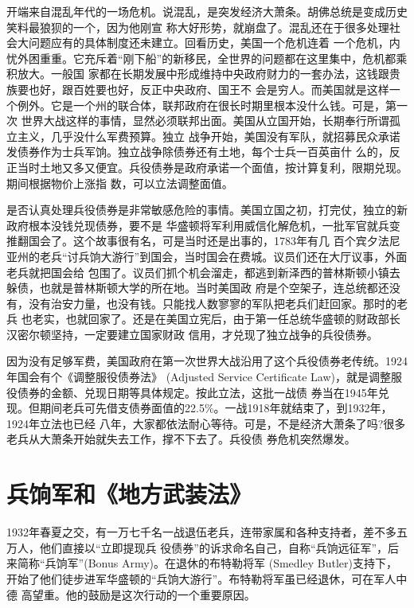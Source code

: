 \documentclass[10pt]{article}
\begin{document}
{开端来自混乱年代的一场危机。说混乱，是突发经济大萧条。胡佛总统是变成历史笑料最狼狈的一个，因为他刚宣
称大好形势，就崩盘了。混乱还在于很多处理社会大问题应有的具体制度还未建立。回看历史，美国一个危机连着
一个危机，内忧外困重重。它充斥着``刚下船''的新移民，全世界的问题都在这里集中，危机都乘积放大。一般国
家都在长期发展中形成维持中央政府财力的一套办法，这钱跟贵族要也好，跟百姓要也好，反正中央政府、国王不
会是穷人。而美国就是这样一个例外。它是一个州的联合体，联邦政府在很长时期里根本没什么钱。可是，第一次
世界大战这样的事情，显然必须联邦出面。美国从立国开始，长期奉行所谓孤立主义，几乎没什么军费预算。独立
战争开始，美国没有军队，就招募民众承诺发债券作为士兵军饷。独立战争除债券还有土地，每个士兵一百英亩什
么的，反正当时土地又多又便宜。兵役债券是政府承诺一个面值，按计算复利，限期兑现。期间根据物价上涨指
数，可以立法调整面值。

是否认真处理兵役债券是非常敏感危险的事情。美国立国之初，打完仗，独立的新政府根本没钱兑现债券，要不是
华盛顿将军利用威信化解危机，一批军官就兵变推翻国会了。这个故事很有名，可是当时还是出事的，1783年有几
百个宾夕法尼亚州的老兵``讨兵饷大游行''到国会，当时国会在费城。议员们还在大厅议事，外面老兵就把国会给
包围了。议员们抓个机会溜走，都逃到新泽西的普林斯顿小镇去躲债，也就是普林斯顿大学的所在地。当时美国政
府是个空架子，连总统都还没有，没有治安力量，也没有钱。只能找人数寥寥的军队把老兵们赶回家。那时的老兵
也老实，也就回家了。还是在美国立宪后，由于第一任总统华盛顿的财政部长汉密尔顿坚持，一定要建立国家财政
信用，才兑现了独立战争的兵役债券。

因为没有足够军费，美国政府在第一次世界大战沿用了这个兵役债券老传统。1924年国会有个《调整服役债券法》
(Adjusted Service Certificate Law)，就是调整服役债券的金额、兑现日期等具体规定。按此立法，这批一战债
券当在1945年兑现。但期间老兵可先借支债券面值的22.5\%。一战1918年就结束了，到1932年，1924年立法也已经
八年，大家都依法耐心等待。可是，不是经济大萧条了吗?很多老兵从大萧条开始就失去工作，撑不下去了。兵役债
券危机突然爆发。

\pagebreak
\section{兵饷军和《地方武装法》}

1932年春夏之交，有一万七千名一战退伍老兵，连带家属和各种支持者，差不多五万人，他们直接以``立即提现兵
役债券''的诉求命名自己，自称``兵饷远征军''，后来简称``兵饷军''(Bonus Army)。在退休的布特勒将军
(Smedley Butler)支持下，开始了他们徒步进军华盛顿的``兵饷大游行''。布特勒将军虽已经退休，可在军人中德
高望重。他的鼓励是这次行动的一个重要原因。

}
\end{document}
